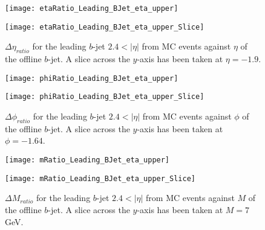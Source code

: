 		\begin{figure}[h]
			\centering

			\begin{minipage}[h]{0.33\linewidth}
				\texttt{[image: etaRatio\_Leading\_BJet\_eta\_upper]}
			\end{minipage}
			\quad
			\begin{minipage}[h]{0.33\linewidth}
				\texttt{[image: etaRatio\_Leading\_BJet\_eta\_upper\_Slice]}
			\end{minipage}
			\caption{$\Delta \eta_{ratio}$ for the leading \pt $b$-jet $2.4 < |\eta|$ from MC events against $\eta$ of the offline $b$-jet. A slice across the $y$-axis has been taken at $\eta=-1.9$. }
			\label{fig:MC:leadingbetaforward}
		\end{figure}

		\begin{figure}[h]
			\centering

			\begin{minipage}[h]{0.33\linewidth}
				\texttt{[image: phiRatio\_Leading\_BJet\_eta\_upper]}
			\end{minipage}
			\quad
			\begin{minipage}[h]{0.33\linewidth}
				\texttt{[image: phiRatio\_Leading\_BJet\_eta\_upper\_Slice]}
			\end{minipage}
			\caption{$\Delta \phi_{ratio}$ for the leading \pt $b$-jet $2.4 < |\eta|$ from MC events against $\phi$ of the offline $b$-jet. A slice across the $y$-axis has been taken at $\phi=-1.64$. }
			\label{fig:MC:leadingbphiforward}
		\end{figure}

		\begin{figure}[h]
			\centering

			\begin{minipage}[h]{0.33\linewidth}
				\texttt{[image: mRatio\_Leading\_BJet\_eta\_upper]}
			\end{minipage}
			\quad
			\begin{minipage}[h]{0.33\linewidth}
				\texttt{[image: mRatio\_Leading\_BJet\_eta\_upper\_Slice]}
			\end{minipage}
			\caption{$\Delta M_{ratio}$ for the leading \pt $b$-jet $2.4 < |\eta|$ from MC events against $M$ of the offline $b$-jet. A slice across the $y$-axis has been taken at $M=7$GeV. }
			\label{fig:MC:leadingbmforward}
		\end{figure}
		
